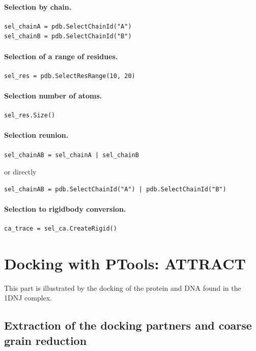 \documentclass[12pt,a4paper]{article}
\begin{document}
\paragraph{Selection by chain.}
\begin{verbatim}
sel_chainA = pdb.SelectChainId("A")
sel_chainB = pdb.SelectChainId("B")
\end{verbatim}


\paragraph{Selection of a range of residues.}
\begin{verbatim}
sel_res = pdb.SelectResRange(10, 20)
\end{verbatim}


\paragraph{Selection number of atoms.}
\begin{verbatim}
sel_res.Size()
\end{verbatim}



\paragraph{Selection reunion.}
\begin{verbatim}
sel_chainAB = sel_chainA | sel_chainB
\end{verbatim}
or directly
\begin{verbatim}
sel_chainAB = pdb.SelectChainId("A") | pdb.SelectChainId("B")
\end{verbatim}


\paragraph{Selection to rigidbody conversion.}
\begin{verbatim}
ca_trace = sel_ca.CreateRigid()
\end{verbatim}



\section{Docking with PTools: ATTRACT}

This part is illustrated by the docking of the protein and DNA found in the 1DNJ complex.

\subsection{Extraction of the docking partners and coarse grain reduction}
\end{document}
